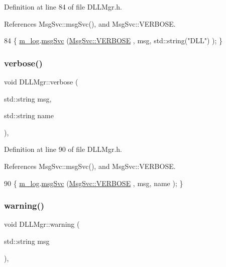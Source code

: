 Definition at line 84 of file D\+L\+L\+Mgr.\+h.



References Msg\+Svc\+::msg\+Svc(), and Msg\+Svc\+::\+V\+E\+R\+B\+O\+SE.


\begin{DoxyCode}
84 \{ \hyperlink{classDLLMgr_a64b523faed64378451ee76f6fbf0800d}{m\_log}.\hyperlink{classMsgSvc_ad25f18047920cc59a314e5098259711c}{msgSvc} (\hyperlink{classMsgSvc_ae671eb7301996cd049d2da8a65925926af655256b06494ade5ba830abe5401ec9}{MsgSvc::VERBOSE} , msg, std::string(\textcolor{stringliteral}{"DLL"}) ); \}
\end{DoxyCode}
\mbox{\label{classDLLMgr_a7a7c039320f83aac50f315ed608d67e3}} 
\subsubsection{\texorpdfstring{verbose()}{verbose()}\hspace{0.1cm}{\footnotesize\ttfamily [2/2]}}
{\footnotesize\ttfamily void D\+L\+L\+Mgr\+::verbose (\begin{DoxyParamCaption}\item[{std\+::string}]{msg,  }\item[{std\+::string}]{name }\end{DoxyParamCaption})\hspace{0.3cm}{\ttfamily [inline]}, {\ttfamily [private]}}



Definition at line 90 of file D\+L\+L\+Mgr.\+h.



References Msg\+Svc\+::msg\+Svc(), and Msg\+Svc\+::\+V\+E\+R\+B\+O\+SE.


\begin{DoxyCode}
90 \{ \hyperlink{classDLLMgr_a64b523faed64378451ee76f6fbf0800d}{m\_log}.\hyperlink{classMsgSvc_ad25f18047920cc59a314e5098259711c}{msgSvc} (\hyperlink{classMsgSvc_ae671eb7301996cd049d2da8a65925926af655256b06494ade5ba830abe5401ec9}{MsgSvc::VERBOSE}  , msg, name ); \}
\end{DoxyCode}
\mbox{\label{classDLLMgr_ad8a177de233cda457b5566e4ff3bb50e}} 
\subsubsection{\texorpdfstring{warning()}{warning()}\hspace{0.1cm}{\footnotesize\ttfamily [1/2]}}
{\footnotesize\ttfamily void D\+L\+L\+Mgr\+::warning (\begin{DoxyParamCaption}\item[{std\+::string}]{msg }\end{DoxyParamCaption})\hspace{0.3cm}{\ttfamily [inline]}, {\ttfamily [private]}}



